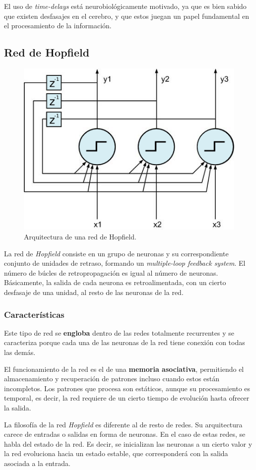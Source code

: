\documentclass[10pt,a4paper]{article}
\begin{document}
El uso de \textit{time-delays} está neurobiológicamente motivado, ya que es bien sabido que existen desfasajes en el cerebro, y que estos juegan un papel fundamental en el procesamiento de la información.


\subsection{Red de Hopfield}

\begin{figure}
  \label{fig:hopfield}
  \caption{Arquitectura de una red de Hopfield.}
  \centering
  \hbox{\includegraphics[width=0.45\textwidth-\fboxrule-\fboxrule]{hopfield.png}}  
\end{figure}	

La red de \textit{Hopfield} consiste en un grupo de neuronas y su correspondiente conjunto de unidades de retraso, formando un \textit{multiple-loop feedback system}. El número de búcles de retropropagación es igual al número de neuronas. Básicamente, la salida de cada neurona es retroalimentada, con un cierto desfasaje de una unidad, al resto de las neuronas de la red.

\subsubsection{Características}

Este tipo de red se \textbf{engloba} dentro de las redes totalmente recurrentes y se caracteriza porque cada una de las neuronas de la red tiene conexión con todas las demás.

El funcionamiento de la red es el de una \textbf{memoria asociativa}, permitiendo el almacenamiento y recuperación de patrones incluso cuando estos están incompletos. Los patrones que procesa son estáticos, aunque su procesamiento es temporal, es decir, la red requiere de un cierto tiempo de evolución hasta ofrecer la salida.

La filosofía de la red \textit{Hopfield} es diferente al de resto de redes. Su arquitectura carece de entradas o salidas en forma de neuronas. En el caso de estas redes, se habla del estado de la red. Es decir, se inicializan las neuronas a un cierto valor y la red evoluciona hacia un estado estable, que corresponderá con la salida asociada a la entrada.
\end{document}
